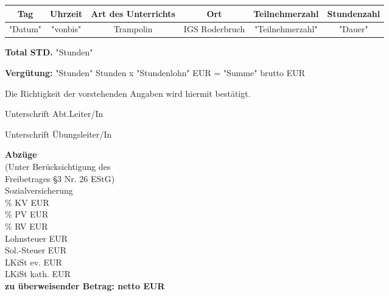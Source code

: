 \documentclass[a4paper,10pt,BCOR=0mm]{scrreprt}
\begin{document}
\begin{flushright}
\begin{tabular}{|c|c|c|c|c|c|}\hline
 \textbf{Tag}
&
 \textbf{Uhrzeit}
&
 \textbf{Art des Unterrichts}
&
\textbf{Ort}
&
\textbf{Teilnehmerzahl}
&
 \textbf{Stundenzahl}\\\hline\hline
"Datum"
&
"vonbis"
&
Trampolin
&
IGS Roderbruch
&
"Teilnehmerzahl"
&
"Dauer"
\\\hline
\end{tabular} 
\begin{flushright}
\parbox{5cm}{\textbf{Total STD.} "Stunden"}\end{flushright}
\hfill\hfill \textbf{Vergütung:} "Stunden" Stunden x "Stundenlohn" EUR = "Summe" brutto EUR \hspace*{2cm}\\
\end{flushright}
\vfill
Die Richtigkeit der vorstehenden Angaben wird hiermit bestätigt.\\
\begin{center}
\parbox{6cm}{
\vspace{9mm}
\begin{center}
Unterschrift Abt.Leiter/In
\end{center}
\vspace{9mm}
\begin{center}
Unterschrift Übungsleiter/In
\end{center}
}
\hfill
\parbox{0.45\textwidth }{
\begin{small}\textbf{Abzüge}\hfill \hspace*{2cm}\\
(Unter Berücksichtigung des\hfill \hspace*{2cm}\\
Freibetrages \S 3 Nr. 26 EStG)\hfill \hspace*{2cm}\\
\hspace*{2cm} Sozialversicherung \hfill \hspace*{2cm}\\
\hspace*{2cm} \% KV \hfill  EUR \hspace*{2cm} \\
\hspace*{2cm} \% PV \hfill  EUR \hspace*{2cm} \\
\hspace*{2cm} \% RV \hfill  EUR \hspace*{2cm} \\
Lohnsteuer  \hfill \hfill EUR \hspace*{2cm} \\
Sol.-Steuer  \hfill \hfill EUR \hspace*{2cm} \\
LKiSt ev. \hfill \hfill EUR \hspace*{2cm} \\
LKiSt kath. \hfill \hfill EUR \hspace*{2cm} \\
\hfill*\textbf{zu überweisender Betrag: netto EUR} \hspace*{2cm}\\
\end{small}}
\end{center}
\end{document}
